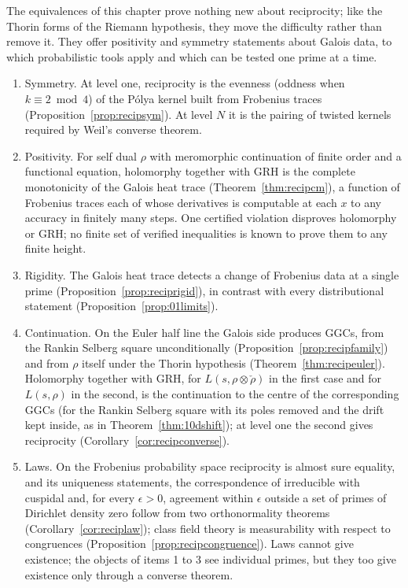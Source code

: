 The equivalences of this chapter prove nothing new about reciprocity; like the Thorin forms of the Riemann hypothesis, they move the difficulty rather than remove it. They offer positivity and symmetry statements about Galois data, to which probabilistic tools apply and which can be tested one prime at a time.
\begin{enumerate}
\item Symmetry. At level one, reciprocity is the evenness (oddness when $k\equiv2\bmod4$) of the P\'olya kernel built from Frobenius traces (Proposition~\ref{prop:recipsym}). At level $N$ it is the pairing of twisted kernels required by Weil's converse theorem.
\item Positivity. For self dual $\rho$ with meromorphic continuation of finite order and a functional equation, holomorphy together with GRH is the complete monotonicity of the Galois heat trace (Theorem~\ref{thm:recipcm}), a function of Frobenius traces each of whose derivatives is computable at each $x$ to any accuracy in finitely many steps. One certified violation disproves holomorphy or GRH; no finite set of verified inequalities is known to prove them to any finite height.
\item Rigidity. The Galois heat trace detects a change of Frobenius data at a single prime (Proposition~\ref{prop:reciprigid}), in contrast with every distributional statement (Proposition~\ref{prop:01limits}).
\item Continuation. On the Euler half line the Galois side produces GGCs, from the Rankin Selberg square unconditionally (Proposition~\ref{prop:recipfamily}) and from $\rho$ itself under the Thorin hypothesis (Theorem~\ref{thm:recipeuler}). Holomorphy together with GRH, for $L(s,\rho\otimes\check\rho)$ in the first case and for $L(s,\rho)$ in the second, is the continuation to the centre of the corresponding GGCs (for the Rankin Selberg square with its poles removed and the drift kept inside, as in Theorem~\ref{thm:10dshift}); at level one the second gives reciprocity (Corollary~\ref{cor:recipconverse}).
\item Laws. On the Frobenius probability space reciprocity is almost sure equality, and its uniqueness statements, the correspondence of irreducible with cuspidal and, for every $\epsilon>0$, agreement within $\epsilon$ outside a set of primes of Dirichlet density zero follow from two orthonormality theorems (Corollary~\ref{cor:reciplaw}); class field theory is measurability with respect to congruences (Proposition~\ref{prop:recipcongruence}). Laws cannot give existence; the objects of items 1 to 3 see individual primes, but they too give existence only through a converse theorem.

\end{enumerate}
